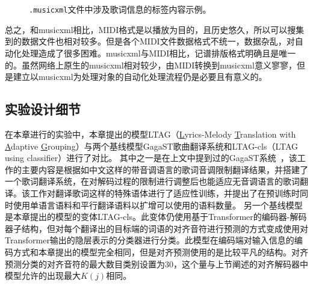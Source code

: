 \begin{figure}[ht]
    \centering
    \\
    \\
    \caption{\texttt{.musicxml}文件中涉及歌词信息的标签内容示例。}
\end{figure}
总之，和musicxml相比，MIDI格式是以播放为目的，且历史悠久，所以可以搜集到的数据文件也相对较多。但是各个MIDI文件数据格式不统一，数据杂乱，对自动化处理造成了很多困难。musicxml与MIDI相比，记谱排版格式明确且是唯一的。虽然网络上原生的musicxml相对较少，由MIDI转换到musicxml意义寥寥，但是建立以musicxml为处理对象的自动化处理流程仍是必要且有意义的。
\subsection{实验设计细节}
在本章进行的实验中，本章提出的模型LTAG（\underline{L}yrics-Melody \underline{T}ranslation with
\underline{A}daptive \underline{G}rouping）与两个基线模型GagaST歌曲翻译系统和LTAG-cls（LTAG using classifier）进行了对比。
其中之一是在上文中提到过的GagaST系统~\cite{gagast}，该工作的主要内容是根据如中文这样的带音调语言的歌词音调限制翻译结果，并搭建了一个歌词翻译系统，在对解码过程的限制进行调整后也能适应无音调语言的歌词翻译。该工作对翻译歌词这样的特殊语体进行了适应性训练，并提出了在预训练时同时使用单语言语料和平行翻译语料以扩增可以使用的语料数量。
另一个基线模型是本章提出的模型的变体LTAG-cls。此变体仍使用基于Transformer的编码器-解码器子结构，但对每个翻译出的目标端的词语的对齐音符进行预测的方式变成使用对Transformer输出的隐层表示的分类器进行分类。此模型在编码端对输入信息的编码方式和本章提出的模型完全相同，但是对齐预测使用的是比较平凡的结构。对齐预测分类的对齐音符的最大数目类别设置为30，这个量与上节阐述的对齐解码器中模型允许的出现最大$K(j)$相同。

